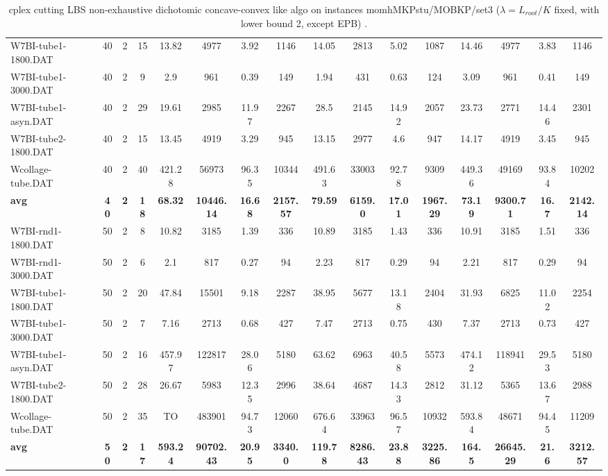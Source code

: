 \begin{sidewaystable}[!ht]
{\begin{tabular}{lccccccccccccccc}
W7BI-tube1-1800.DAT & 40 & 2 & 15 & 13.82 & 4977 & 3.92 & 1146 & 14.05 & 2813 & 5.02 & 1087 & 14.46 & 4977 &  \textcolor{blue2}{3.83} & 1146 \\
W7BI-tube1-3000.DAT & 40 & 2 & 9 & 2.9 & 961 &  \textcolor{blue2}{0.39} & 149 & 1.94 & 431 & 0.63 & 124 & 3.09 & 961 & 0.41 & 149 \\
W7BI-tube1-asyn.DAT & 40 & 2 & 29 & 19.61 & 2985 &  \textcolor{blue2}{11.97} & 2267 & 28.5 & 2145 & 14.92 & 2057 & 23.73 & 2771 & 14.46 & 2301 \\
W7BI-tube2-1800.DAT & 40 & 2 & 15 & 13.45 & 4919 &  \textcolor{blue2}{3.29} & 945 & 13.15 & 2977 & 4.6 & 947 & 14.17 & 4919 & 3.45 & 945 \\
Wcollage-tube.DAT & 40 & 2 & 40 & 421.28 & 56973 & 96.35 & 10344 & 491.63 & 33003 &  \textcolor{blue2}{92.78} & 9309 & 449.36 & 49169 & 93.84 & 10202 \\
\cline{1-16} \textbf{avg} & \textbf{40} & \textbf{2} & \textbf{18} & \textbf{68.32} & \textbf{10446.14} & \textbf{16.68} & \textbf{2157.57} & \textbf{79.59} & \textbf{6159.0} & \textbf{17.01} & \textbf{1967.29} & \textbf{73.19} & \textbf{9300.71} & \textbf{16.7} & \textbf{2142.14} \\ \cline{1-16}
W7BI-rnd1-1800.DAT & 50 & 2 & 8 & 10.82 & 3185 &  \textcolor{blue2}{1.39} & 336 & 10.89 & 3185 & 1.43 & 336 & 10.91 & 3185 & 1.51 & 336 \\
W7BI-rnd1-3000.DAT & 50 & 2 & 6 & 2.1 & 817 &  \textcolor{blue2}{0.27} & 94 & 2.23 & 817 & 0.29 & 94 & 2.21 & 817 & 0.29 & 94 \\
W7BI-tube1-1800.DAT & 50 & 2 & 20 & 47.84 & 15501 &  \textcolor{blue2}{9.18} & 2287 & 38.95 & 5677 & 13.18 & 2404 & 31.93 & 6825 & 11.02 & 2254 \\
W7BI-tube1-3000.DAT & 50 & 2 & 7 & 7.16 & 2713 &  \textcolor{blue2}{0.68} & 427 & 7.47 & 2713 & 0.75 & 430 & 7.37 & 2713 & 0.73 & 427 \\
W7BI-tube1-asyn.DAT & 50 & 2 & 16 & 457.97 & 122817 &  \textcolor{blue2}{28.06} & 5180 & 63.62 & 6963 & 40.58 & 5573 & 474.12 & 118941 & 29.53 & 5180 \\
W7BI-tube2-1800.DAT & 50 & 2 & 28 & 26.67 & 5983 &  \textcolor{blue2}{12.35} & 2996 & 38.64 & 4687 & 14.33 & 2812 & 31.12 & 5365 & 13.67 & 2988 \\
Wcollage-tube.DAT & 50 & 2 & 35 &  TO & 483901 & 94.73 & 12060 & 676.64 & 33963 & 96.57 & 10932 & 593.84 & 48671 &  \textcolor{blue2}{94.45} & 11209 \\
\cline{1-16} \textbf{avg} & \textbf{50} & \textbf{2} & \textbf{17} & \textbf{593.24} & \textbf{90702.43} & \textbf{20.95} & \textbf{3340.0} & \textbf{119.78} & \textbf{8286.43} & \textbf{23.88} & \textbf{3225.86} & \textbf{164.5} & \textbf{26645.29} & \textbf{21.6} & \textbf{3212.57} \\ \cline{1-16}
\bottomrule
\end{tabular}
}%
\caption{cplex cutting LBS non-exhaustive dichotomic concave-convex like algo on instances momhMKPstu/MOBKP/set3 ($\lambda = L_{root}/K$ fixed, with lower bound 2, except EPB)  .}
\label{tab:table_LBS_factor2_momhMKPstu/MOBKP/set3 }
\end{sidewaystable}
